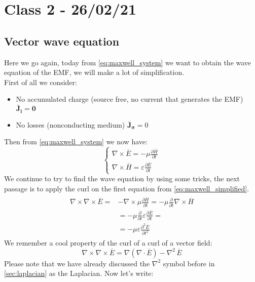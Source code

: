 \section{Class 2 - 26/02/21}
\subsection*{Vector wave equation}
Here we go again, today from \cref{eq:maxwell_system} we want to obtain the wave equation of the EMF, we will make a lot of simplification.\\
First of all we consider:
\begin{itemize}
    \item No accumulated charge (source free, no current that generates the EMF) $\boldsymbol{\overline{J}_i=0}$
    \item No losses (nonconducting medium) $\boldsymbol{\overline{J}_\sigma}=0$
\end{itemize}
Then from \cref{eq:maxwell_system} we now have:
\begin{equation}\label{eq:maxwell_simplified}
    \begin{cases}
    \nabla\times\overline{E}=-\mu\frac{\partial \overline{H}}{\partial t}\\[5pt]
    \nabla\times\overline{H}=\varepsilon\frac{\partial \overline{E}}{\partial t}
    \end{cases}
\end{equation}
We continue to try to find the wave equation by using some tricks, the next passage is to apply the curl on the first equation from \cref{eq:maxwell_simplified}.
\begin{align}
    \begin{split}
        \nabla\times\nabla\times\overline{E}=&-\nabla\times\mu \frac{\partial \overline{H}}{\partial t}=-\mu \frac{\partial}{\partial t} \nabla\times \overline{H}\\[5pt]
        &=-\mu \frac{\partial}{\partial t}\varepsilon\frac{\partial \overline{E}}{\partial t}=\\[5pt]
        &=-\mu \varepsilon \frac{\partial^2\overline{E}}{\partial t^2}
    \end{split}
\end{align}
We remember a cool property of the curl of a curl of a vector field:
\begin{equation}
    \nabla\times\nabla\times\overline{E}=\nabla(\nabla\cdot \overline{E})-\nabla^2\,\overline{E}
\end{equation}
Please note that we have already discussed the $\nabla^2$ symbol before in \cref{sec:laplacian} as the Laplacian. Now let's write:
